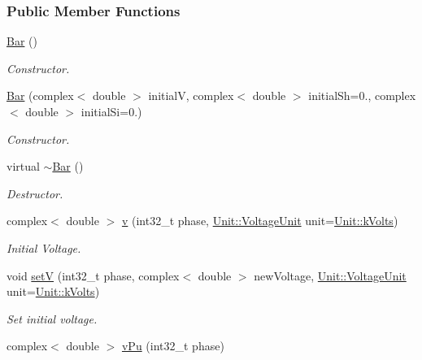 \subsubsection*{Public Member Functions}
\begin{DoxyCompactItemize}
\item 
\hyperlink{group___models_ga9cae2188fcc6cce41caa7898c64548d1}{Bar} ()
\begin{DoxyCompactList}\small\item\em Constructor. \end{DoxyCompactList}\item 
\hyperlink{group___models_gab1c5a81ad40dbc7ee745077b4f5c20d4}{Bar} (complex$<$ double $>$ initial\+V, complex$<$ double $>$ initial\+Sh=0., complex$<$ double $>$ initial\+Si=0.)
\begin{DoxyCompactList}\small\item\em Constructor. \end{DoxyCompactList}\item 
virtual \hyperlink{group___models_ga9c7ebea0c189423591741ac438985316}{$\sim$\+Bar} ()
\begin{DoxyCompactList}\small\item\em Destructor. \end{DoxyCompactList}\item 
complex$<$ double $>$ \hyperlink{group___models_ga1e6f2daec86407118656d88170d1adc2}{v} (int32\+\_\+t phase, \hyperlink{class_unit_a55b07dfa9457e1eca2c7194fe0cfc3c1}{Unit\+::\+Voltage\+Unit} unit=\hyperlink{class_unit_a55b07dfa9457e1eca2c7194fe0cfc3c1aa54b2473993a702a3923525765bd6e4c}{Unit\+::k\+Volts})
\begin{DoxyCompactList}\small\item\em Initial Voltage. \end{DoxyCompactList}\item 
void \hyperlink{group___models_ga9b6fbc92674bfcdc9d5090795ab335a6}{set\+V} (int32\+\_\+t phase, complex$<$ double $>$ new\+Voltage, \hyperlink{class_unit_a55b07dfa9457e1eca2c7194fe0cfc3c1}{Unit\+::\+Voltage\+Unit} unit=\hyperlink{class_unit_a55b07dfa9457e1eca2c7194fe0cfc3c1aa54b2473993a702a3923525765bd6e4c}{Unit\+::k\+Volts})
\begin{DoxyCompactList}\small\item\em Set initial voltage. \end{DoxyCompactList}\item 
complex$<$ double $>$ \hyperlink{group___models_ga1c54bd76b2f620d970ddfed8cdae4116}{v\+Pu} (int32\+\_\+t phase)

\end{DoxyCompactItemize}
